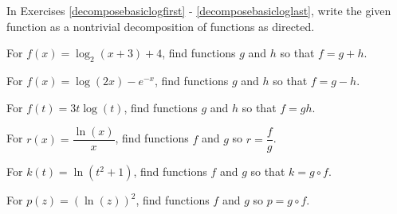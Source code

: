 \documentclass{ximera}
\begin{document}
\begin{question}
In Exercises \ref{decomposebasiclogfirst} - \ref{decomposebasicloglast}, write the given function as a nontrivial decomposition of functions as directed.

\begin{problem}\label{decomposebasiclogfirst}
For $f(x) = \log_{2}(x+3) + 4$, find functions $g$ and $h$ so that $f=g+h$. 
\end{problem}

\begin{problem}
For $f(x) = \log(2x) - e^{-x}$, find functions $g$ and $h$ so that $f=g-h$. 
\end{problem}

\begin{problem}
For $f(t) = 3t \log(t)$, find functions $g$ and $h$ so that $f=gh$.
\end{problem}

\begin{problem}
For $r(x) = \dfrac{\ln(x)}{x}$, find functions $f$ and $g$ so $r = \dfrac{f}{g}$.
\end{problem}

\begin{problem}
For $k(t) = \ln(t^2+1)$, find functions $f$ and $g$  so that $k = g \circ f$.
\end{problem}

\begin{problem}\label{decomposebasicloglast}
For $p(z) = (\ln(z))^2$, find functions $f$ and $g$ so $p = g \circ f$. 
\end{problem}
\end{question}
\end{document}
